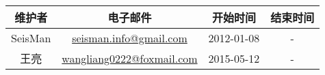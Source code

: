 \section*{}

\begin{table}[H]
\centering
\begin{tabular}{cccc}
\toprule
维护者      & 电子邮件                               &   开始时间    &   结束时间    \\
\midrule
SeisMan     & \small{\url{seisman.info@gmail.com}}   &  2012-01-08   &   -           \\
王亮     & \small{\url{wangliang0222@foxmail.com}}   &  2015-05-12   &   -           \\
\bottomrule
\end{tabular}
\end{table}
